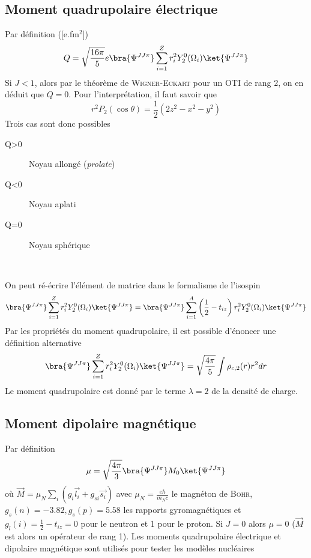 \subsection{Moment quadrupolaire électrique}
Par définition ([e.fm$^2$])
\begin{equation}
Q = \sqrt{\dfrac{16\pi}{5}}e\bra{\Psi^{JJ\pi}}\sum_{i=1}^Z r_i^2Y_2^0(\Omega_i)\ket{\Psi^{JJ\pi}}
\end{equation}
Si $J<1$, alors par le théorème de \textsc{Wigner-Eckart} pour un OTI de rang 2, on en déduit que $Q=0$. Pour 
l'interprétation, il faut savoir que
\begin{equation}
r^2P_2(\cos\theta) = \frac{1}{2}(2z^2-x^2-y^2)
\end{equation}
Trois cas sont donc possibles
\begin{description}
\item[Q>0] Noyau allongé (\textit{prolate})
\item[Q<0] Noyau aplati
\item[Q=0] Noyau sphérique
\end{description}\ 

On peut ré-écrire l'élément de matrice dans le formalisme de l'isospin
\begin{equation}
\bra{\Psi^{JJ\pi}}\sum_{i=1}^Z r_i^2Y_2^0(\Omega_i)\ket{\Psi^{JJ\pi}} =
\bra{\Psi^{JJ\pi}}\sum_{i=1}^A \left(\frac{1}{2}-t_{iz}\right) r_i^2Y_2^0(\Omega_i)\ket{\Psi^{JJ\pi}}
\end{equation}
Par les propriétés du moment quadrupolaire, il est possible d'énoncer une définition alternative
\begin{equation}
\bra{\Psi^{JJ\pi}}\sum_{i=1}^Z r_i^2Y_2^0(\Omega_i)\ket{\Psi^{JJ\pi}} = \sqrt{\dfrac{4\pi}{5}}\int
\rho_{c,2}(r)r^2dr
\end{equation}
Le moment quadrupolaire est donné par le terme $\lambda=2$ de la densité de charge.

\subsection{Moment dipolaire magnétique}
Par définition
\begin{equation}
\mu = \sqrt{\dfrac{4\pi}{3}}\bra{\Psi^{JJ\pi}}M_0\ket{\Psi^{JJ\pi}}
\end{equation}
où $\vec{M} = \mu_N\sum_i(g_i\vec{l_i}+g_{si}\vec{s_i})$ avec $\mu_N=\frac{e\hbar}{m_Nc}$ le 
magnéton de \textsc{Bohr}, $g_s(n)=-3.82, g_s(p)=5.58$ les rapports gyromagnétiques et 
$g_l(i) = \frac{1}{2}-t_{iz}=0$ pour le neutron et 1 pour le proton. Si $J=0$ alors $\mu=0$ 
($\vec{M}$ est alors un opérateur de rang 1). Les moments quadrupolaire électrique et dipolaire 
magnétique sont utilisés pour tester les modèles nucléaires